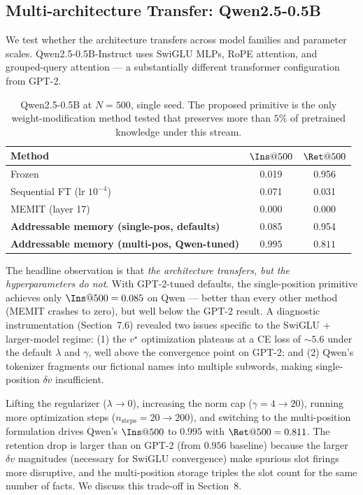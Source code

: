 \documentclass[11pt,a4paper]{article}
\begin{document}
\subsection{Multi-architecture Transfer: Qwen2.5-0.5B}

We test whether the architecture transfers across model families and
parameter scales. Qwen2.5-0.5B-Instruct uses SwiGLU MLPs, RoPE attention,
and grouped-query attention --- a substantially different transformer
configuration from GPT-2.

\begin{table}[h]
\centering
\caption{Qwen2.5-0.5B at $N=500$, single seed. The proposed primitive
is the only weight-modification method tested that preserves more than
$5\%$ of pretrained knowledge under this stream.}
\label{tab:main-qwen}
\begin{tabular}{lcc}
\toprule
\textbf{Method} & $\Ins@500$ & $\Ret@500$ \\
\midrule
Frozen & 0.019 & 0.956 \\
Sequential FT (lr $10^{-4}$) & 0.071 & 0.031 \\
MEMIT (layer 17) & 0.000 & 0.000 \\
\midrule
\textbf{Addressable memory (single-pos, defaults)} & 0.085 & 0.954 \\
\textbf{Addressable memory (multi-pos, Qwen-tuned)} & $\mathbf{0.995}$ & $\mathbf{0.811}$ \\
\bottomrule
\end{tabular}
\end{table}

The headline observation is that \emph{the architecture transfers, but
the hyperparameters do not}. With GPT-2-tuned defaults, the
single-position primitive achieves only $\Ins@500 = 0.085$ on Qwen ---
better than every other method (MEMIT crashes to zero), but well below
the GPT-2 result. A diagnostic instrumentation (Section~7.6) revealed
two issues specific to the SwiGLU + larger-model regime:
(1) the $v^\star$ optimization plateaus at a CE loss of $\sim 5.6$
under the default $\lambda$ and $\gamma$, well above the convergence
point on GPT-2; and
(2) Qwen's tokenizer fragments our fictional names into multiple
subwords, making single-position $\delta v$ insufficient.

Lifting the regularizer ($\lambda \to 0$), increasing the norm cap
($\gamma = 4 \to 20$), running more optimization steps
($n_\text{steps} = 20 \to 200$), and switching to the multi-position
formulation drives Qwen's $\Ins@500$ to $0.995$ with $\Ret@500 = 0.811$.
The retention drop is larger than on GPT-2 (from $0.956$ baseline)
because the larger $\delta v$ magnitudes (necessary for SwiGLU
convergence) make spurious slot firings more disruptive, and the
multi-position storage triples the slot count for the same number of
facts. We discuss this trade-off in Section~8.
\end{document}
